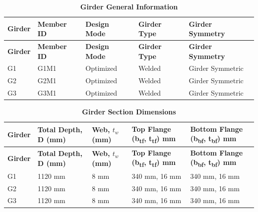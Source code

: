 \documentclass[12pt,a4paper]{report}
\numberwithin{table}{chapter}
\numberwithin{figure}{chapter}
\begin{document}
\newpage

\vspace{0.4em}
\noindent
            
\vspace{4pt}
\begin{longtable}{|L{2.2cm}|L{1.8cm}|p{3.8cm}|p{3.8cm}|p{3.8cm}|}
\caption{\textbf{Girder General Information}}
\hline
\textbf{Girder} & \textbf{Member ID} & \textbf{Design Mode} & \textbf{Girder Type} & \textbf{Girder Symmetry} \\[6pt]
\hline
\endfirsthead

\hline
\textbf{Girder} & \textbf{Member ID} & \textbf{Design Mode} & \textbf{Girder Type} & \textbf{Girder Symmetry} \\[6pt]
\hline
\endhead
G1 & G1M1 & Optimized & Welded & Girder Symmetric \\[8pt]
\hline
G2 & G2M1 & Optimized & Welded & Girder Symmetric \\[8pt]
\hline
G3 & G3M1 & Optimized & Welded & Girder Symmetric \\[8pt]
\hline
\end{longtable}

\vspace{0.6em}

\vspace{4pt}
\begin{longtable}{|L{1.8cm}|L{2.3cm}|L{1.8cm}|p{4.8cm}|p{4.8cm}|}
\caption{\textbf{Girder Section Dimensions}}
\hline
\textbf{Girder} & \textbf{Total Depth, D (mm)} & \textbf{Web, $t_w$ (mm)} & \textbf{Top Flange (b\textsubscript{tf}, t\textsubscript{tf}) mm} & \textbf{Bottom Flange (b\textsubscript{bf}, t\textsubscript{bf}) mm} \\[6pt]
\hline
\endfirsthead

\hline
\textbf{Girder} & \textbf{Total Depth, D (mm)} & \textbf{Web, $t_w$ (mm)} & \textbf{Top Flange (b\textsubscript{tf}, t\textsubscript{tf}) mm} & \textbf{Bottom Flange (b\textsubscript{bf}, t\textsubscript{bf}) mm} \\[6pt]
\hline
\endhead
G1 & 1120 mm & 8 mm & 340 mm, 16 mm & 340 mm, 16 mm \\[8pt]
\hline
G2 & 1120 mm & 8 mm & 340 mm, 16 mm & 340 mm, 16 mm \\[8pt]
\hline
G3 & 1120 mm & 8 mm & 340 mm, 16 mm & 340 mm, 16 mm \\[8pt]
\hline
\end{longtable}

\vspace{0.6em}
\end{document}
